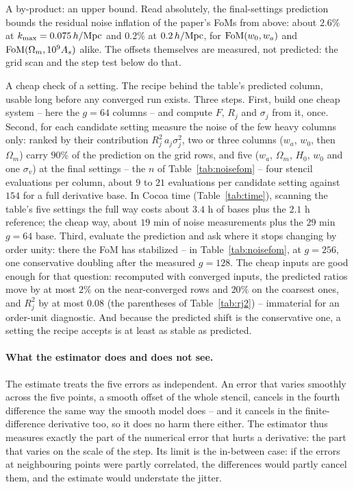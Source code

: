 \documentclass[11pt]{article}
\newcommand{\kmax}{k_{\rm max}}
\newcommand{\hMpc}{\,h/{\rm Mpc}}
\begin{document}
A by-product: an upper bound.  Read absolutely, the final-settings
prediction bounds the residual noise inflation of the paper's FoMs
from above: about $2.6\%$ at $\kmax = 0.075\hMpc$ and $0.2\%$ at
$0.2\hMpc$, for ${\rm FoM}(w_0, w_a)$ and
${\rm FoM}(\Omega_m, 10^9 A_s)$ alike.  The offsets themselves are
measured, not predicted: the grid scan and the step test below do
that.

A cheap check of a setting.  The recipe behind the table's
predicted column, usable long before any converged run exists.
Three steps.  First, build one cheap system -- here the $g = 64$
columns -- and compute $F$, $R_j$ and $\sigma_j$ from it, once.
Second, for each candidate setting measure the noise of the few
heavy columns only: ranked by their contribution
$R_j^2\,a_j\sigma_j^2$, two or three columns ($w_a$, $w_0$, then
$\Omega_m$) carry $90\%$ of the prediction on the grid rows, and
five ($w_a$, $\Omega_m$, $H_0$, $w_0$ and one $\sigma_v$) at the
final settings -- the $n$ of Table~\ref{tab:noisefom} -- four
stencil evaluations per column, about $9$ to $21$ evaluations per
candidate setting against $154$ for a full derivative base.  In
Cocoa time (Table~\ref{tab:time}), scanning the table's five
settings the full way costs about $3.4$ h of bases plus the
$2.1$ h reference; the cheap way, about $19$ min of noise
measurements plus the $29$ min $g = 64$ base.  Third, evaluate the
prediction and ask where it stops changing by order unity: there
the FoM has stabilized -- in Table~\ref{tab:noisefom}, at
$g = 256$, one conservative doubling after the measured $g = 128$.
The cheap inputs are good enough for that question: recomputed
with converged inputs, the predicted ratios move by at most $2\%$
on the near-converged rows and $20\%$ on the coarsest ones, and
$R_j^2$ by at most $0.08$ (the parentheses of
Table~\ref{tab:rj2}) -- immaterial for an order-unit diagnostic.
And because the predicted shift is the conservative one, a setting
the recipe accepts is at least as stable as predicted.

\paragraph{What the estimator does and does not see.}
The estimate treats the five errors as independent.  An error that
varies smoothly across the five points, a smooth offset of the whole
stencil, cancels in the fourth difference the same way the smooth
model does -- and it cancels in the finite-difference derivative too,
so it does no harm there either.  The estimator thus measures exactly
the part of the numerical error that hurts a derivative: the part that
varies on the scale of the step.  Its limit is the in-between case: if
the errors at neighbouring points were partly correlated, the
differences would partly cancel them, and the estimate would
understate the jitter.
\end{document}

